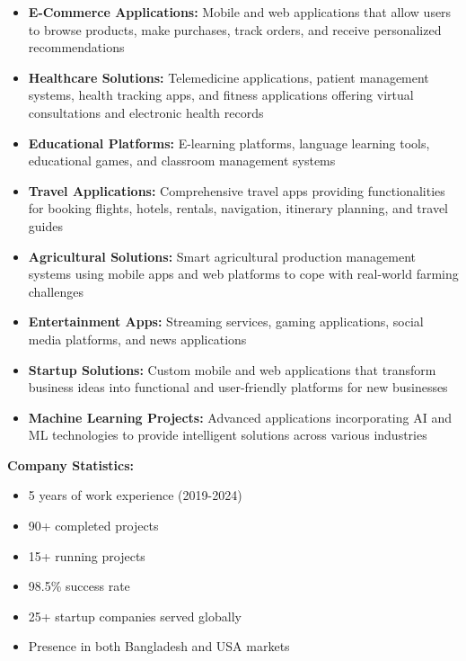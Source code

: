 \documentclass[12pt,a4paper]{article}
\begin{document}
\begin{itemize}
    \item \textbf{E-Commerce Applications:} Mobile and web applications that allow users to browse products, make purchases, track orders, and receive personalized recommendations
    
    \item \textbf{Healthcare Solutions:} Telemedicine applications, patient management systems, health tracking apps, and fitness applications offering virtual consultations and electronic health records
    
    \item \textbf{Educational Platforms:} E-learning platforms, language learning tools, educational games, and classroom management systems
    
    \item \textbf{Travel Applications:} Comprehensive travel apps providing functionalities for booking flights, hotels, rentals, navigation, itinerary planning, and travel guides
    
    \item \textbf{Agricultural Solutions:} Smart agricultural production management systems using mobile apps and web platforms to cope with real-world farming challenges
    
    \item \textbf{Entertainment Apps:} Streaming services, gaming applications, social media platforms, and news applications
    
    \item \textbf{Startup Solutions:} Custom mobile and web applications that transform business ideas into functional and user-friendly platforms for new businesses
    
    \item \textbf{Machine Learning Projects:} Advanced applications incorporating AI and ML technologies to provide intelligent solutions across various industries
\end{itemize}

\textbf{Company Statistics:}
\begin{itemize}
    \item 5 years of work experience (2019-2024)
    \item 90+ completed projects
    \item 15+ running projects
    \item 98.5\% success rate
    \item 25+ startup companies served globally
    \item Presence in both Bangladesh and USA markets
\end{itemize}
\end{document}
